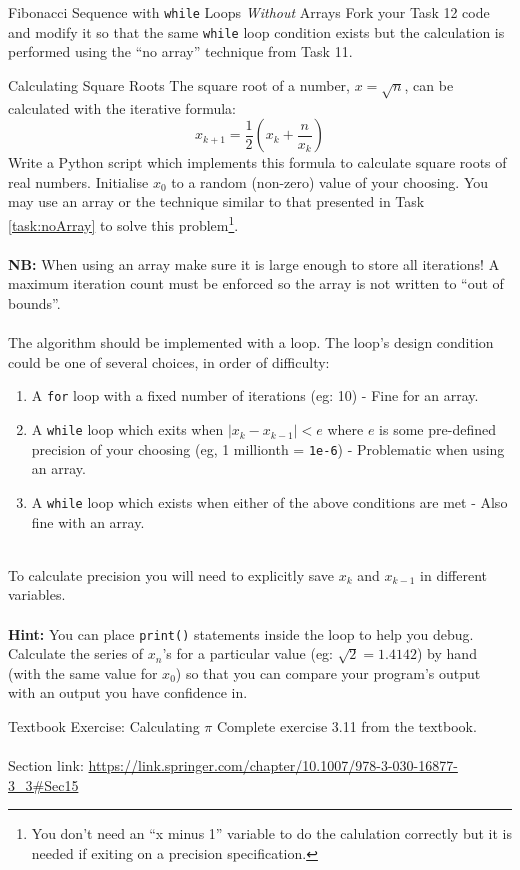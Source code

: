\documentclass{lab}
\begin{document}
\begin{task}{Fibonacci Sequence with \texttt{while} Loops \textit{Without} Arrays}{}
Fork your Task 12 code and modify it so that the same \texttt{while} loop condition exists but the calculation is performed using the ``no array'' technique from Task 11.
\end{task}

\pagebreak
\begin{task}{Calculating Square Roots}{}
The square root of a number, $x = \sqrt{n}$, can be calculated with the iterative formula:
\begin{equation}\label{eq:sqrt}
x_{k+1} = \frac{1}{2}\left(x_k + \frac{n}{x_k}\right)
\end{equation}
Write a Python script which implements this formula to calculate square roots of real numbers. Initialise $x_0$ to a random (non-zero) value of your choosing. You may use an array or the technique similar to that presented in Task \ref{task:noArray} to solve this problem\footnote{You don't need an ``x minus 1'' variable to do the calulation correctly but it is needed if exiting on a precision specification.}.
\\ \\
\textbf{NB:} When using an array make sure it is large enough to store all iterations! A maximum iteration count must be enforced so the array is not written to ``out of bounds''.
\\ \\
The algorithm should be implemented with a loop. The loop's design condition could be one of several choices, in order of difficulty:\\
\begin{enumerate}
\item A \texttt{for} loop with a fixed number of iterations (eg: 10) - Fine for an array.
\item A \texttt{while} loop which exits when $\left| x_k - x_{k-1} \right| < e$ where $e$ is some pre-defined precision of your choosing (eg, 1 millionth = \texttt{1e-6}) - Problematic when using an array.
\item A \texttt{while} loop which exists when either of the above conditions are met - Also fine with an array.
\end{enumerate}
~\\
To calculate precision you will need to explicitly save $x_k$ and $x_{k-1}$ in different variables.
\\~\\
\textbf{Hint:} You can place \texttt{print()} statements inside the loop to help you debug. Calculate the series of $x_n$'s for a particular value (eg: $\sqrt{2}=1.4142$) by hand (with the same value for $x_0$) so that you can compare your program's output with an output you have confidence in.
\end{task}\label{tsk:sqrt}

\begin{task}{Textbook Exercise: Calculating $\pi$}{}
Complete exercise 3.11 from the textbook.
\\~\\
Section link: \url{https://link.springer.com/chapter/10.1007/978-3-030-16877-3_3#Sec15}
\end{task}
\end{document}
